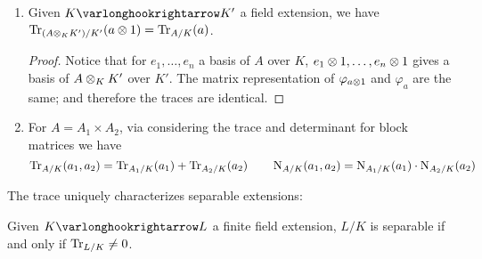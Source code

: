 \documentclass{article}
\begin{document}
\begin{remark}
\begin{enumerate}[label=\arabic*)]
\begin{proof}
            Write out the basis for the corresponding algebras. Choose $e_1, \dots, e_m$ a basis for $K$ as a $k$-vector space, and $f_1, \dots, f_n$ a basis for $A$ as a $K$-vector space. Then $(e_i f_r)$ for $1 \leq i \leq n$, $1 \leq r \leq m$ gives a basis of $A$ as a $k$-vector space. Fix $a \in A$, define $(c_{ij}) \in K$ and $(\gamma_{ijrs}) \in k$ as 
            \[
                a f_j = \sum_{i = 1}^n c_{ij} f_i, \qquad c_{ij} e_s = \sum_{r = 1}^m \gamma_{ijrs} e_r
            \]
            Verify the equality of both sides:
            \[
                \mathrm{RHS} = \Tr_{K/k} \circ \Tr_{A/K}(a) = \sum_{i = 1}^n \Tr_{K/k} (c_{ii}) = \sum_{i = 1}^n \sum_{r = 1}^m \gamma_{iirr}
            \]
            while $\varphi_a$ in the basis for $A$ over $k$ can be expressed as
            \[
                a f_j e_s = \sum_{i = 1}^n c_{ij} f_i e_s = \sum_{i = 1}^n \sum_{r = 1}^m \gamma_{ijrs} f_i e_r \quad \implies \quad \mathrm{LHS} = \Tr_{A/K}(a) = \sum_{i = 1}^n \sum_{r = 1}^m \gamma_{iirr}
            \]
        \end{proof}
        \item Given $K \ext K'$ a field extension, we have $\operatorname{Tr}_{(A \otimes_K K')/K'}(a \otimes 1) = \operatorname{Tr}_{A/K}(a)$.
        \begin{proof}
            Notice that for $e_1, \dots, e_n$ a basis of $A$ over $K$, $e_1 \otimes 1, \dots, e_n \otimes 1$ gives a basis of $A \otimes_K K'$ over $K'$. The matrix representation of $\varphi_{a \otimes 1}$ and $\varphi_a$ are the same; and therefore the traces are identical.
        \end{proof}
        \item For $A = A_1 \times A_2$, via considering the trace and determinant for block matrices we have
        \[
            \operatorname{Tr}_{A/K}(a_1, a_2) = \operatorname{Tr}_{A_1/K}(a_1) + \operatorname{Tr}_{A_2/K}(a_2) \qquad \operatorname{N}_{A/K}(a_1, a_2) = \operatorname{N}_{A_1/K}(a_1) \cdot \operatorname{N}_{A_2/K}(a_2)
        \]
    \end{enumerate}
\end{remark}

\textstart
The trace uniquely characterizes separable extensions:

\begin{theorem}\label{thm: ext separable iff trace nonzero}
    Given $K \ext L$ a finite field extension, $L/K$ is separable if and only if $\operatorname{Tr}_{L/K} \neq 0$.
\end{theorem}
\end{document}
